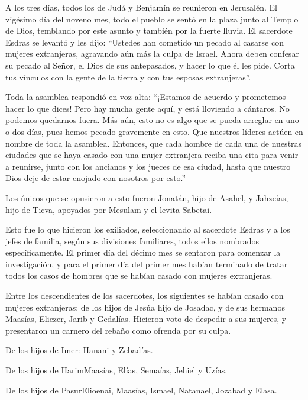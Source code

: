  A los tres días, todos los de Judá y Benjamín se reunieron
en Jerusalén. El vigésimo día del noveno mes, todo el pueblo se sentó en
la plaza junto al Templo de Dios, temblando por este asunto y también
por la fuerte lluvia.  El sacerdote Esdras se levantó y les
dijo: ``Ustedes han cometido un pecado al casarse con mujeres
extranjeras, agravando aún más la culpa de Israel.  Ahora
deben confesar su pecado al Señor, el Dios de sus antepasados, y hacer
lo que él les pide. Corta tus vínculos con la gente de la tierra y con
tus esposas extranjeras''.

 Toda la asamblea respondió en voz alta: ``¡Estamos de
acuerdo y prometemos hacer lo que dices!  Pero hay mucha
gente aquí, y está lloviendo a cántaros. No podemos quedarnos fuera. Más
aún, esto no es algo que se pueda arreglar en uno o dos días, pues hemos
pecado gravemente en esto.  Que nuestros líderes actúen en
nombre de toda la asamblea. Entonces, que cada hombre de cada una de
nuestras ciudades que se haya casado con una mujer extranjera reciba una
cita para venir a reunirse, junto con los ancianos y los jueces de esa
ciudad, hasta que nuestro Dios deje de estar enojado con nosotros por
esto.''

 Los únicos que se opusieron a esto fueron Jonatán, hijo de
Asahel, y Jahzeías, hijo de Ticva, apoyados por Mesulam y el levita
Sabetai.

 Esto fue lo que hicieron los exiliados, seleccionando al
sacerdote Esdras y a los jefes de familia, según sus divisiones
familiares, todos ellos nombrados específicamente. El primer día del
décimo mes se sentaron para comenzar la investigación,  y
para el primer día del primer mes habían terminado de tratar todos los
casos de hombres que se habían casado con mujeres extranjeras.

 Entre los descendientes de los sacerdotes, los siguientes
se habían casado con mujeres extranjeras: de los hijos de Jesúa hijo de
Josadac, y de sus hermanos Maasías, Eliezer, Jarib y Gedalías.
 Hicieron voto de despedir a sus mujeres, y presentaron un
carnero del rebaño como ofrenda por su culpa.

 De los hijos de Imer: Hanani y Zebadías.

 De los hijos de HarimMaasías, Elías, Semaías, Jehiel y
Uzías.

 De los hijos de PasurElioenai, Maasías, Ismael, Natanael,
Jozabad y Elasa.

